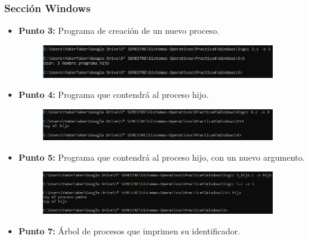 \documentclass[12pt]{article}
\begin{document}
            \subsubsection{Sección Windows}
        \begin{itemize}
            \item[\Checkmark] \textbf{Punto 3:} Programa de creación de un nuevo proceso.   
                \begin{figure}[h!]
                    \centering
                    \includegraphics[width=0.95\textwidth]{Practica4/Images/Windows/3.PNG}
                \end{figure}
            
            \item[\Checkmark] \textbf{Punto 4:} Programa que contendrá al proceso hijo.     
                \begin{figure}[h!]
                    \centering
                    \includegraphics[width=0.95\textwidth]{Practica4/Images/Windows/4.PNG}
                \end{figure}

                
            \item[\Checkmark] \textbf{Punto 5:} Programa que contendrá al proceso hijo, con un nuevo argumento.
                
                \begin{figure}[h!]
                    \centering
                    \includegraphics[width=0.95\textwidth]{Practica4/Images/Windows/5.PNG}
                \end{figure}
            \newpage
            \item[\Checkmark] \textbf{Punto 7:} Árbol de procesos que imprimen su identificador.
            

\end{itemize}
\end{document}
